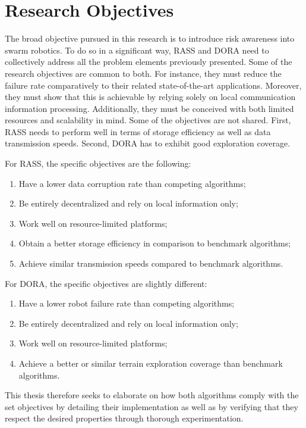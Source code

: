 \section{Research Objectives}  %
The broad objective pursued in this research is to introduce risk awareness into swarm robotics. To do so in a significant way, \ac{RASS} and \ac{DORA} need to collectively address all the problem elements previously presented. Some of the research objectives are common to both. For instance, they must reduce the failure rate comparatively to their related state-of-the-art applications. Moreover, they must show that this is achievable by relying solely on local communication information processing. Additionally, they must be conceived with both limited resources and scalability in mind. Some of the objectives are not shared. First, \ac{RASS} needs to perform well in terms of storage efficiency as well as data transmission speeds. Second, \ac{DORA} has to exhibit good exploration coverage.

For \ac{RASS}, the specific objectives are the following:
\begin{enumerate}
    \item Have a lower data corruption rate than competing algorithms;
    \item Be entirely decentralized and rely on local information only;
    \item Work well on resource-limited platforms;
    \item Obtain a better storage efficiency in comparison to benchmark algorithms;
    \item Achieve similar transmission speeds compared to benchmark algorithms.
\end{enumerate}

For \ac{DORA}, the specific objectives are slightly different:
\begin{enumerate}
    \item Have a lower robot failure rate than competing algorithms;
    \item Be entirely decentralized and rely on local information only;
    \item Work well on resource-limited platforms;
    \item Achieve a better or similar terrain exploration coverage than benchmark algorithms.
\end{enumerate}

This thesis therefore seeks to elaborate on how both algorithms comply with the set objectives by detailing their implementation as well as by verifying that they respect the desired properties through thorough experimentation.


